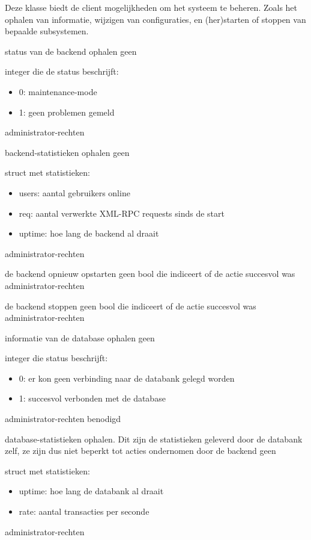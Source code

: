 Deze klasse biedt de client mogelijkheden om het systeem te beheren. Zoals het ophalen van informatie, wijzigen van configuraties, en (her)starten of stoppen van bepaalde subsystemen.

	{ status van de backend ophalen }
	{ geen }
	{ integer die de status beschrijft:
		\begin{itemize}
		\item{0: maintenance-mode}
		\item{1: geen problemen gemeld}
		\end{itemize} }
	{ administrator-rechten }

	{ backend-statistieken ophalen }
	{ geen }
	{ struct met statistieken:
		\begin{itemize}
		\item{users: aantal gebruikers online}
		\item{req: aantal verwerkte XML-RPC requests sinds de start}
		\item{uptime: hoe lang de backend al draait}
		\end{itemize} }
	{ administrator-rechten }

	{ de backend opnieuw opstarten }
	{ geen }
	{ bool die indiceert of de actie succesvol was }
	{ administrator-rechten }

	{ de backend stoppen }
	{ geen }
	{ bool die indiceert of de actie succesvol was }
	{ administrator-rechten }

	{ informatie van de database ophalen }
	{ geen }
	{ integer die status beschrijft:
		\begin{itemize}
		\item{0: er kon geen verbinding naar de databank gelegd worden}
		\item{1: succesvol verbonden met de database}
		\end{itemize} }
	{ administrator-rechten benodigd}

	{ database-statistieken ophalen. Dit zijn de statistieken geleverd door de databank zelf, ze zijn dus niet beperkt tot acties ondernomen door de backend }
	{ geen }
	{ struct met statistieken:
		\begin{itemize}
		\item{uptime: hoe lang de databank al draait}
		\item{rate: aantal transacties per seconde}
		\end{itemize} }
	{ administrator-rechten }

